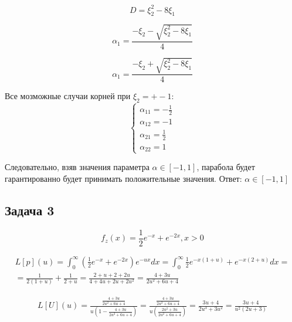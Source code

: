 \documentclass[a4paper,12pt]{article}
\begin{document}
\[ D = \xi_2^2 - 8\xi_1 \]

\[ \alpha_1 = \frac{-\xi_2 - \sqrt{\xi_2^2 - 8\xi_1}}{4} \]

\[ \alpha_1 = \frac{-\xi_2 + \sqrt{\xi_2^2 - 8\xi_1}}{4} \]


Все мозможные случаи корней при $ \xi_2 = +- 1 $:
\[ 
\begin{cases}
	\alpha_{11} = -\frac{1}{2}\\
	\alpha_{12} = -1\\
	\alpha_{21} = \frac{1}{2}\\
	\alpha_{22} = 1
\end{cases}
 \]

Следовательно, взяв значения параметра $ \alpha \in [-1, 1] $, парабола будет гарантированно будет принимать положительные значения.
Ответ:  $ \alpha \in [-1, 1] $

\subsection{Задача 3}

\[  f _ { z } ( x ) = \frac { 1 } { 2 } e ^ { - x } + e ^ { - 2 x } , x > 0  \]

\begin{equation}
\begin{aligned}  L [ p ] ( u ) = \int _ { 0 } ^ { \infty } \left( \frac { 1 } { 2 } e ^ { - x } + e ^ { - 2 x } \right) e ^ { - u x } d x  = \int _ { 0 } ^ { \infty } \frac { 1 } { 2 } e ^ { - x ( 1 + u ) } + e ^ { - x ( 2 + u ) } d x = \\ = \frac { 1 } { 2 ( 1 + u ) } + \frac { 1 } { 2 + u } = \frac { 2 + u + 2 + 2 u } { 4 + 4 u + 2 u + 2 u ^ { 2 } } =  \frac { 4 + 3 u } { 2 u ^ { 2 } + 6 u + 4 } \end{aligned}
\end{equation}

\begin{equation}
\begin{aligned}
L [ U ] ( u ) = \frac { \frac { 4 + 3 u } { 2 u ^ { 2 } + 6 u + 4 } } { u \left( 1 - \frac { 4 + 3 u } { 2 u ^ { 2 } + 6 u + 4 } \right) } = \frac { \frac { 4 + 3 u } { 2 u ^ { 2 } + 6 u + 4 } } { u \left( \frac { 2 u ^ { 2 } + 3 u } { 2 u ^ { 2 } + 6 u + 4 } \right) }= \frac { 3 u + 4 } { 2 u ^ { 3 } + 3 u ^ { 2 } } = \frac { 3 u  + 4 } { u ^ { 2 } ( 2 u + 3 ) } 
\end{aligned}
\end{equation}
\end{document}

